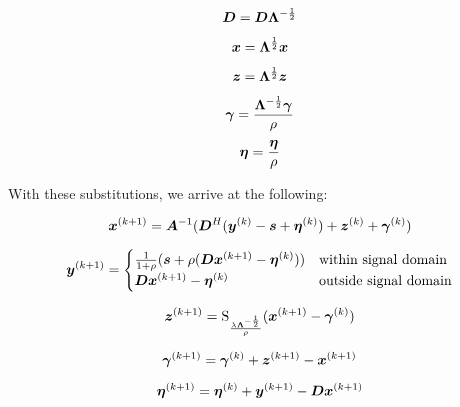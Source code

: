 \documentclass{article}
\begin{document}
\begin{equation}
\bm{D} = \bm{D}\bm{\Lambda}^{-\frac{1}{2}}
\end{equation}

\begin{equation}
\bm{x} = \bm{\Lambda}^{\frac{1}{2}}\bm{x}
\end{equation}

\begin{equation}
\bm{z} = \bm{\Lambda}^{\frac{1}{2}}\bm{z}
\end{equation}

\begin{equation}
\bm{\gamma} = \frac{\bm{\Lambda}^{-\frac{1}{2}}\bm{\gamma}}{\rho}
\end{equation}
\begin{equation}
\bm{\eta} = \frac{\bm{\eta}}{\rho}
\end{equation}

With these substitutions, we arrive at the following:

\begin{equation}
\bm{x}^{(k + 1)} = \bm{A}^{-1}(\bm{D}^H(\bm{y}^{(k)} - \bm{s} + \bm{\eta}^{(k)}) + \bm{z}^{(k)} + \bm{\gamma}^{(k)})
\end{equation}

\begin{equation}
\bm{y}^{(k + 1)}= \begin{cases}
\frac{1}{1 + \rho}(\bm{s} + \rho(\bm{D}\bm{x}^{(k + 1)} - \bm{\eta}^{(k)})) & \text{within signal domain}\\
\bm{D}\bm{x}^{(k + 1)} - \bm{\eta}^{(k)} & \text{outside signal domain}
\end{cases}
\end{equation}

\begin{equation}
\bm{z}^{(k + 1)}= \operatorname{S}_{\frac{\lambda\bm{\Lambda}^{-\frac{1}{2}}}{\rho}}(\bm{x}^{(k + 1)} - \bm{\gamma}^{(k)})
\end{equation}

\begin{equation}
\bm{\gamma}^{(k + 1)} = \bm{\gamma}^{(k)} + \bm{z}^{(k + 1)} - \bm{x}^{(k + 1)}
\end{equation}

\begin{equation}
\bm{\eta}^{(k + 1)} = \bm{\eta}^{(k)} + \bm{y}^{(k + 1)} - \bm{D}\bm{x}^{(k + 1)}
\end{equation}
\end{document}
